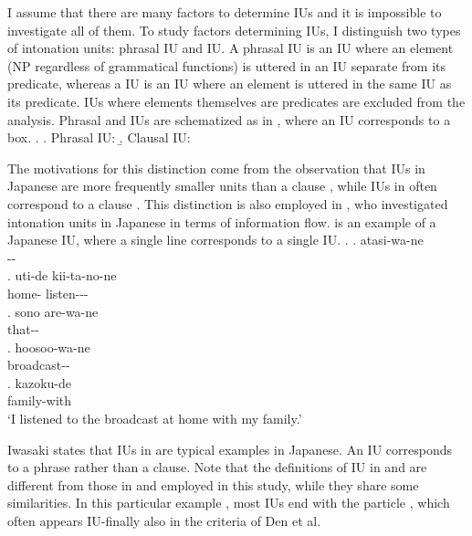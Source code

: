I assume that there are many factors to determine IUs
and it is impossible to investigate all of them.
To study  factors determining IUs,
I distinguish two types of intonation units:
phrasal IU and  IU.
A phrasal IU is an IU where an element (NP regardless of grammatical functions) is uttered in an IU separate from its predicate, whereas
a  IU is an IU where an element is uttered in the same IU as its predicate.
IUs where elements themselves are predicates are excluded from the analysis.
Phrasal and  IUs are schematized as in \Next,
where an IU corresponds to a box.
%
\ex.
 \a. Phrasal IU:  
 \b. Clausal IU: 

The motivations for this distinction come from the observation that IUs in Japanese are more frequently smaller units than a clause \cite{iwasaki93},
while IUs in  often correspond to a clause \cite{chafe94}.
This distinction is also employed in ,
who investigated intonation units in Japanese in terms of information flow.
\Next is an example of a Japanese IU,
where a single line corresponds to a single IU.
%
\ex.
 \ag. atasi-wa-ne \\
 		-- \\
 \bg. uti-de kii-ta-no-ne \\
 	home- listen--- \\
 \bg. sono are-wa-ne \\
 	 that-- \\
 \bg. hoosoo-wa-ne \\
 	broadcast--\\
 \bg. kazoku-de \\
 	family-with \\
	`I listened to the broadcast at home with my family.'
	\hfill{\cite[][p.~40]{iwasaki93}}

Iwasaki states that IUs in \Last are typical examples in Japanese.
An IU corresponds to a phrase rather than a clause.
Note that the definitions of IU in  and  are different from those in  and  employed in this study,
while they share some similarities.
In this particular example \Last,
most IUs end with the  particle ,
which often appears IU-finally also in the criteria of Den et al.


